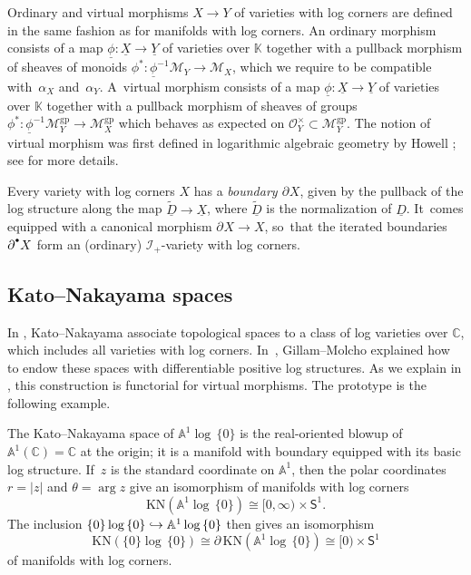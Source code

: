 \documentclass[10pt]{amsart}
\let\oldbullet\bullet
\renewcommand{\bullet}{{\raisebox{1pt}{$\scriptscriptstyle\oldbullet$}}}
\newcommand\hto{\mathrel{\lhook\joinrel\to}}
\theoremstyle{definition}
\theoremstyle{remark}
\newenvironment{example}
  {\pushQED{\qed}\renewcommand{\qedsymbol}{$\lozenge$}\examplex}
  {\popQED\endexamplex}
\let\defn\emph
\newcommand{\CC}{\mathbb{C}}
\newcommand{\KK}{\mathbb{K}}
\newcommand{\AF}{\mathbb{A}}
\newcommand{\halfspc}[1]{[0,\infty)^{#1}}
\newcommand{\logcyl}{\AF^1 \log\, \{0\}}
\newcommand{\logcirc}{\{0\} \log\, \{0\}}
\newcommand{\cO}[1]{\mathcal{O}_{#1}}
\newcommand{\cOx}[1]{\cO{#1}^\times}
\newcommand{\cM}{\mathscr{M}}
\newcommand{\cMgp}{\mathscr{M}^{\mathrm{gp}}}
\newcommand{\uphi}{\underline{\phi}}
\newcommand{\bdX}[1][]{\partial^{#1} X}
\newcommand{\uX}{\underline{X}}
\newcommand{\uY}{\underline{Y}}
\newcommand{\uD}{\underline{D}}
\newcommand{\KN}[1]{\mathrm{KN}(#1)}
\newcommand{\unitcirc}{\mathsf{S}^{1}}
\newcommand{\ascat}{\mathscr{I}_+}
\begin{document}
Ordinary and virtual morphisms $X \to Y$ of varieties with log corners are defined in the same fashion as for manifolds with log corners. An ordinary morphism consists of a map $\uphi \colon \uX \to \uY$ of varieties over $\KK$ together with a pullback morphism of sheaves of monoids $\phi^* : \uphi^{-1}\cM_{Y} \to \cM_X$, which we require to be compatible with~$\alpha_X$ and~$\alpha_Y$. A~virtual morphism consists of a map $\uphi\colon \uX\to \uY$ of varieties over $\KK$ together with a pullback morphism of sheaves of groups $\phi^*\colon \uphi^{-1}\cMgp_Y\to \cMgp_X$ which behaves as expected on $\cOx{Y} \subset \cMgp_Y$. The notion of virtual morphism was first defined in logarithmic algebraic geometry by Howell \cite{Howell2017}; see \cite{DPP:WeakMorphisms} for more details.

Every variety with log corners $X$ has a \defn{boundary $\bdX$}, given by the pullback of the log structure along the map $\widetilde{\uD} \to\uX$, where $\widetilde{\uD}$ is the normalization of $\uD$. It~comes equipped with a canonical morphism $\bdX \to X$, so~that the iterated boundaries $\bdX[\bullet]$ form an (ordinary) $\ascat$-variety with log corners.

\subsection{Kato--Nakayama spaces}\label{sec:KN}

In \cite{KatoNakayama}, Kato--Nakayama associate topological spaces to a class of log varieties over $\CC$, which includes all varieties with log corners. In~\cite{GillamMolcho}, Gillam--Molcho explained how to endow these spaces with differentiable positive log structures. As we explain in \cite{DPP:WeakMorphisms}, this construction is functorial for virtual morphisms. The prototype is the following example.

\begin{example}
The Kato--Nakayama space of $\logcyl$ is the real-oriented blowup of $\AF^1(\CC) = \CC$ at the origin; it is a manifold with boundary equipped with its basic log structure. If~$z$ is the standard coordinate on $\AF^1$, then the polar coordinates $r = |z|$ and $\theta = \arg z$ give an isomorphism of manifolds with log corners
\[
\KN{\logcyl} \cong \halfspc{} \times \unitcirc.
\]
The inclusion $\logcirc \hto \logcyl$ then gives an isomorphism
\[
\KN{\logcirc} \cong \partial\, \KN{\logcyl} \cong [0) \times \unitcirc
\]
of manifolds with log corners.
\end{example}
\end{document}
